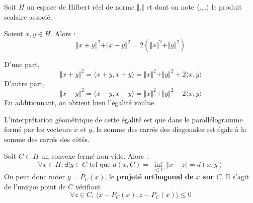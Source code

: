 



	
	Soit $H$ un espace de Hilbert réel de norme $\Vert . \Vert$ et dont on note $\langle ., . \rangle$ le produit scalaire associé.
	
	\begin{lemma}
		\label{projection-convexe-ferme-1}
		Soient $x, y \in H$. Alors :
		\[ \Vert x + y \Vert^2 + \Vert x - y \Vert^2 = 2(\Vert x \Vert^2 + \Vert y \Vert^2) \]
	\end{lemma}

	\begin{demonstration}
		D'une part,
		\[ \Vert x + y \Vert^2 = \langle x + y, x + y \rangle = \Vert x \Vert^2 + \Vert y \Vert^2 + 2 \langle x, y \rangle \]
		D'autre part,
		\[ \Vert x - y \Vert^2 = \langle x - y, x - y \rangle = \Vert x \Vert^2 + \Vert y \Vert^2 - 2 \langle x, y \rangle \]
		En additionnant, on obtient bien l'égalité voulue.
	\end{demonstration}

	\begin{remark}
		L'interprétation géométrique de cette égalité est que dans le parallélogramme formé par les vecteurs $x$ et $y$, la somme des carrés des diagonales est égale à la somme des carrés des côtés.
	\end{remark}
	
	
	\begin{theorem}
		\label{projection-convexe-ferme-2}
		Soit $C \subset H$ un convexe fermé non-vide. Alors :
		\[ \forall x \in H, \exists! y \in C \text{ tel que } d(x, C) = \inf_{z \in C} \Vert x - z \Vert = d(x, y) \]
		On peut donc noter $y = P_C(x)$, le \textbf{projeté orthogonal de $x$ sur $C$}. Il s'agit de l'unique point de $C$ vérifiant
		\[ \forall z \in C, \, \langle x - P_C(x), z - P_C(x) \rangle \leq 0 \tag{$*$} \]
	\end{theorem}

